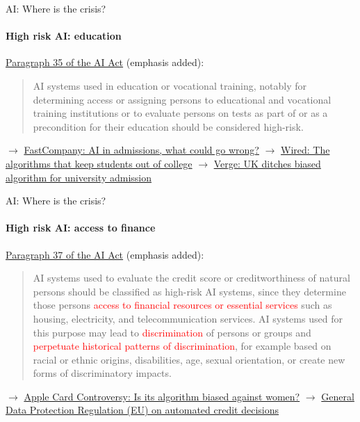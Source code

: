 \begin{frame}{AI: Where is the crisis?}
  \framesubtitle{High risk AI: education}
  \href{https://eur-lex.europa.eu/resource.html?uri=cellar:e0649735-a372-11eb-9585-01aa75ed71a1.0001.02/DOC_1&format=PDF}{Paragraph 35 of the AI Act} (emphasis added):
  \newline
  \begin{quotation}
    AI systems used in education or vocational training, notably for determining access or assigning persons to educational and vocational training institutions or to evaluate persons on tests as part of or as a precondition for their education should be considered high-risk.
  \end{quotation}
  \newline
  $\rightarrow$ \href{https://www.fastcompany.com/90342596/schools-are-quietly-turning-to-ai-to-help-pick-who-gets-in-what-could-go-wrong}{FastCompany: AI in admissions, what could go wrong?}
  \newline
  $\rightarrow$ \href{https://www.wired.com/story/algorithm-set-students-grades-altered-futures/}{Wired: The algorithms that keep students out of college}
  \newline
  $\rightarrow$ \href{https://www.theverge.com/2020/8/17/21372045/uk-a-level-results-algorithm-biased-coronavirus-covid-19-pandemic-university-applications}{Verge: UK ditches biased algorithm for university admission}

\end{frame}

\begin{frame}{AI: Where is the crisis?}
  \framesubtitle{High risk AI: access to finance}
  \href{https://eur-lex.europa.eu/resource.html?uri=cellar:e0649735-a372-11eb-9585-01aa75ed71a1.0001.02/DOC_1&format=PDF}{Paragraph 37 of the AI Act} (emphasis added):
  \begin{quotation}
    AI systems used to evaluate the credit score or creditworthiness of natural persons should be classified as high-risk AI systems, since they determine those persons \textcolor{red}{access to financial resources or essential services} such as housing, electricity, and telecommunication services. AI systems used for this purpose may lead to \textcolor{red}{discrimination} of persons or groups and \textcolor{red}{perpetuate historical patterns of discrimination}, for example based on racial or ethnic origins, disabilities, age, sexual orientation, or create new forms of discriminatory impacts.
  \end{quotation}
  \newline
  $\rightarrow$ \href{https://qz.com/1748321/the-role-of-goldman-sachs-algorithms-in-the-apple-credit-card-scandal/}{Apple Card Controversy: Is its algorithm biased against women?}
  \newline
  $\rightarrow$ \href{https://www.reubenbinns.com/blog/how-to-comply-with-gdpr-article-22-automated-credit-decisions/}{General Data Protection Regulation (EU) on automated credit decisions}
\end{frame}

